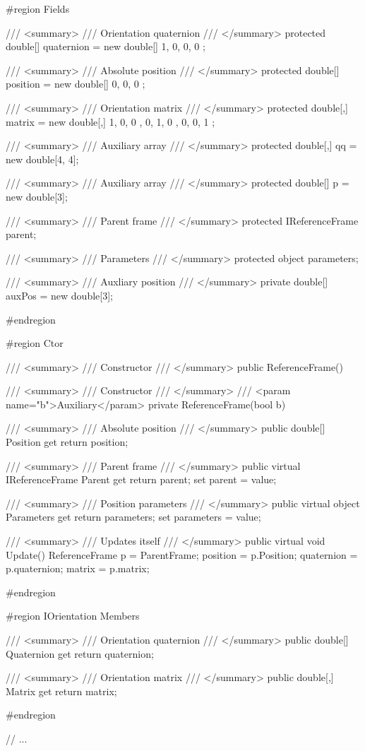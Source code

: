 \documentclass[10pt,journal,compsoc]{IEEEtran}
\begin{document}
{
	
	\#region Fields
	
	/// <summary>
	/// Orientation quaternion
	/// </summary>
	protected double[] quaternion = new double[] { 1, 0, 0, 0 };
	
	/// <summary>
	/// Absolute position
	/// </summary>
	protected double[] position = new double[] { 0, 0, 0 };
	
	/// <summary>
	/// Orientation matrix
	/// </summary>
	protected double[,] matrix = new double[,] { { 1, 0, 0 }, { 0, 1, 0 }, { 0, 0, 1 } };
	
	/// <summary>
	/// Auxiliary array
	/// </summary>
	protected double[,] qq = new double[4, 4];
	
	/// <summary>
	/// Auxiliary array
	/// </summary>
	protected double[] p = new double[3];
	
	/// <summary>
	/// Parent frame
	/// </summary>
	protected IReferenceFrame parent;
	
	/// <summary>
	/// Parameters
	/// </summary>
	protected object parameters;
	
	/// <summary>
	/// Auxliary position
	/// </summary>
	private double[] auxPos = new double[3];
	
	\#endregion
	
	\#region Ctor
	
	/// <summary>
	/// Constructor
	/// </summary>
	public ReferenceFrame()
	{
	}
	
	/// <summary>
	/// Constructor
	/// </summary>
	/// <param name="b">Auxiliary</param>
	private ReferenceFrame(bool b)
	{
	}
	
	/// <summary>
	/// Absolute position
	/// </summary>
	public double[] Position
	{
		get { return position; }
	}
	
	/// <summary>
	/// Parent frame
	/// </summary>
	public virtual IReferenceFrame Parent
	{
		get
		{
			return parent;
		}
		set
		{
			parent = value;
		}
	}
	
	/// <summary>
	/// Position parameters
	/// </summary>
	public virtual object Parameters
	{
		get
		{
			return parameters;
		}
		set
		{
			parameters = value;
		}
	}
	
	/// <summary>
	/// Updates itself
	/// </summary>
	public virtual void Update()
	{
		ReferenceFrame p = ParentFrame;
		position = p.Position;
		quaternion = p.quaternion;
		matrix = p.matrix;
	}
	
	\#endregion
	
	\#region IOrientation Members
	
	/// <summary>
	/// Orientation quaternion
	/// </summary>
	public double[] Quaternion
	{
		get { return quaternion; }
	}
	
	/// <summary>
	/// Orientation matrix
	/// </summary>
	public double[,] Matrix
	{
		get { return matrix; }
	}
	
	\#endregion
	
	// ...
	
}
\end{document}
